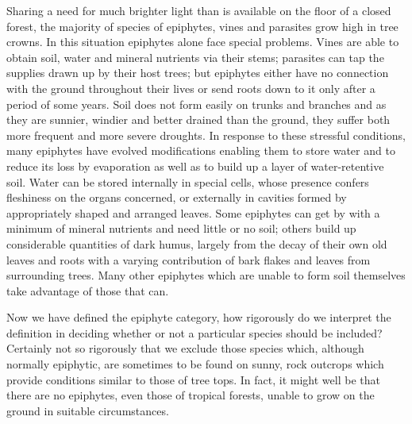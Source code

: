 Sharing a need for much brighter light than is available on the floor of a closed forest, the majority of species of epiphytes, vines and parasites grow high in tree crowns.
In this situation epiphytes alone face special problems.
Vines are able to obtain soil, water and mineral nutrients via their stems; parasites can tap the supplies drawn up by their host trees; but epiphytes either have no connection with the ground throughout their lives or send roots down to it only after a period of some years.
Soil does not form easily on trunks and branches and as they are sunnier, windier and better drained than the ground, they suffer both more frequent and more severe droughts.
In response to these stressful conditions, many epiphytes have evolved modifications enabling them to store water and to reduce its loss by evaporation as well as to build up a layer of water-retentive soil.
Water can be stored internally in special cells, whose presence confers fleshiness on the organs concerned, or externally in cavities formed by appropriately shaped and arranged leaves.
Some epiphytes can get by with a minimum of mineral nutrients and need little or no soil; others build up considerable quantities of dark humus, largely from the decay of their own old leaves and roots with a varying contribution of bark flakes and leaves from surrounding trees.
Many other epiphytes which are unable to form soil themselves take advantage of those that can.

Now we have defined the epiphyte category, how rigorously do we interpret the definition in deciding whether or not a particular species should be included? Certainly not so rigorously that we exclude those species which, although normally epiphytic, are sometimes to be found on sunny, rock outcrops which provide conditions similar to those of tree tops.
In fact, it might well be that there are no epiphytes, even those of tropical forests, unable to grow on the ground in suitable circumstances.

